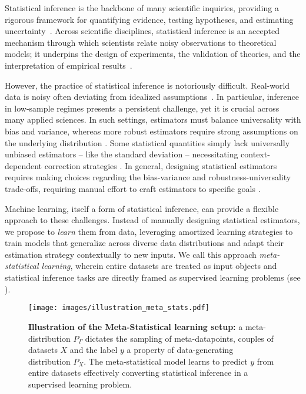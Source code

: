 Statistical inference is the backbone of many scientific inquiries, providing a rigorous framework for quantifying evidence, testing hypotheses, and estimating uncertainty~\cite{walker1953statistical,casella2024statistical}. Across scientific disciplines, statistical inference is an accepted mechanism through which scientists relate noisy observations to theoretical models; it underpins the design of experiments, the validation of theories, and the interpretation of empirical results~\cite{barlow1993statistics, altman1990practical, james2006statistical, dienes2008understanding, salganik2019bit}.

However, the practice of statistical inference is notoriously difficult. Real-world data is noisy often deviating from idealized assumptions~\cite{gurland1971simple, hoekstra2012assumptions,knief2021violating,NEURIPS2023_36b80eae}. In particular, inference in low-sample regimes presents a persistent challenge, yet it is crucial across many applied sciences. In such settings, estimators must balance universality with bias and variance, whereas more robust estimators require strong assumptions on the underlying distribution \cite{casella2024statistical}. Some statistical quantities simply lack universally unbiased estimators -- like the standard deviation -- necessitating context-dependent correction strategies \cite{gurland1971simple,bengio2003no}. In general, designing statistical estimators requires making choices regarding the bias-variance and robustness-universality trade-offs, requiring manual effort to craft estimators to specific goals \cite{silvey2013optimal}.


Machine learning, itself a form of statistical inference, can provide a flexible approach to these challenges. Instead of manually designing statistical estimators, we propose to \textit{learn} them from data, leveraging amortized learning strategies to train models that generalize across diverse data distributions and adapt their estimation strategy contextually to new inputs. We call this approach \textit{meta-statistical learning}, wherein entire datasets are treated as input objects and statistical inference tasks are directly framed as supervised learning problems (see ). 

\begin{figure*}[ht]
    \centering
    \texttt{[image: images/illustration\_meta\_stats.pdf]} %
    \caption{\textbf{Illustration of the Meta-Statistical learning setup:} a meta-distribution $P_{\Gamma}$ dictates the sampling of meta-datapoints, couples of datasets $X$ and the label $y$ a property of data-generating distribution $P_X$. The meta-statistical model learns to predict $y$ from entire datasets effectively converting statistical inference in a supervised learning problem.}
    \label{fig:fig_1_large}
\end{figure*}


